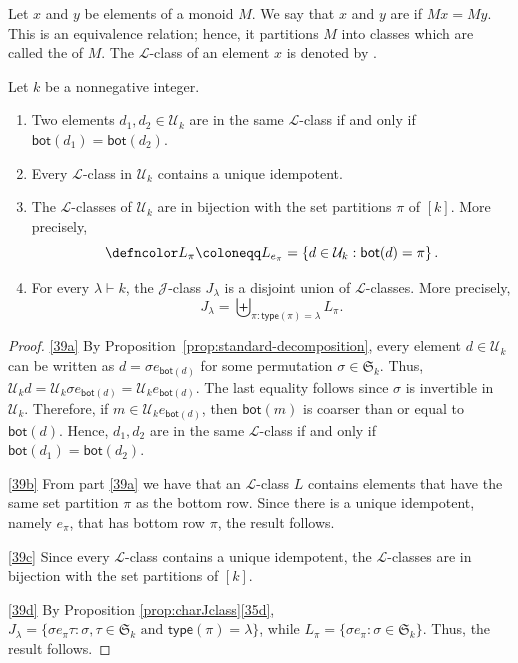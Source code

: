 Let $x$ and $y$ be elements of a monoid $M$.  We say that $x$ and $y$ are  if $Mx = My$.
This is an equivalence relation; hence, it partitions $M$ into classes which are called the  of $M$.
The $\mathscr{L}$-class of an element $x$ is denoted by .

\begin{prop} Let $k$ be a nonnegative integer.
\begin{enumerate}[label=(\alph*)]
    \item\label{39a} Two elements $d_1,d_2\in \mathcal{U}_k$ are in the same $\mathscr{L}$-class if and only if $\mathsf{bot}(d_1) = \mathsf{bot}(d_2)$.
    \item\label{39b} Every $\mathscr{L}$-class in $\mathcal{U}_k$ contains a unique idempotent.
    \item\label{39c} The $\mathscr{L}$-classes of $\mathcal{U}_k$ are in bijection with the set partitions $\pi$ of $[k]$. More precisely,
    $${\defncolor L_\pi} \coloneqq L_{e_\pi} = \left\{ d \in \mathcal{U}_k : \mathsf{bot}(d) = \pi\right\}.$$
    \item\label{39d} For every $\lambda \vdash k$, the $\mathscr{J}$-class $J_\lambda$
        is a disjoint union of $\mathscr{L}$-classes.
        More precisely, $$J_\lambda = \biguplus_{\pi: \mathsf{type}(\pi) = \lambda} L_\pi.$$
\end{enumerate}
\end{prop}

\begin{proof}
\ref{39a} By Proposition~\ref{prop:standard-decomposition}, every element $d \in \mathcal{U}_k$ can be written as
$d = \sigma e_{\mathsf{bot}(d)}$ for some permutation $\sigma \in \mathfrak{S}_k$. Thus,
$\mathcal{U}_k d = \mathcal{U}_k \sigma e_{\mathsf{bot}(d)} = \mathcal{U}_k e_{\mathsf{bot}(d)}$. The last equality follows since $\sigma$
is invertible in $\mathcal{U}_k$. Therefore, if $m \in \mathcal{U}_k e_{\mathsf{bot}(d)}$, then $\mathsf{bot}(m)$ is coarser than or equal to
$\mathsf{bot}(d)$. Hence, $d_1,d_2$ are in the same $\mathscr{L}$-class if and only if $\mathsf{bot}(d_1)= \mathsf{bot}(d_2)$.

\ref{39b} From part \ref{39a} we have that an $\mathscr{L}$-class $L$ contains elements that have the same set partition $\pi$ as the bottom row. Since there is a
unique idempotent, namely $e_\pi$, that has bottom row $\pi$, the result follows.

\ref{39c} Since every $\mathscr{L}$-class contains a unique idempotent, the $\mathscr{L}$-classes are in bijection with the set partitions of $[k]$.

\ref{39d} By Proposition \ref{prop:charJclass}\ref{35d},  $J_\lambda =\{ \sigma e_\pi \tau : \sigma, \tau \in \mathfrak{S}_k \text{ and } \mathsf{type}(\pi) = \lambda\}$, while
$L_\pi = \{\sigma e_\pi : \sigma \in \mathfrak{S}_k \}$. Thus, the result follows.
\end{proof}

